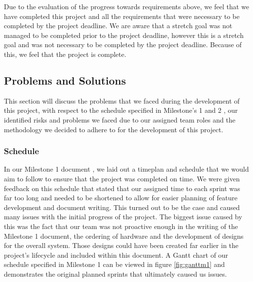             Due to the evaluation of the progress towards requirements above, we feel that we have completed this project and all the requirements that were necessary to be completed by the project deadline. We are aware that a stretch goal was not managed to be completed prior to the project deadline, however this is a stretch goal and was not necessary to be completed by the project deadline. Because of this, we feel that the project is complete.

        \subsection{Problems and Solutions}
        \label{subsec:probs_solutions}

            This section will discuss the problems that we faced during the development of this project, with respect to the schedule specified in Milestone's 1 and 2 \cite{coaker, mile2}, our identified risks and problems we faced due to our assigned team roles and the methodology we decided to adhere to for the development of this project. 

            \subsubsection{Schedule}

                In our Milestone 1 document \cite{coaker}, we laid out a timeplan and schedule that we would aim to follow to ensure that the project was completed on time. We were given feedback on this schedule that stated that our assigned time to each sprint was far too long and needed to be shortened to allow for easier planning of feature development and document writing. This turned out to be the case and caused many issues with the initial progress of the project. The biggest issue caused by this was the fact that our team was not proactive enough in the writing of the Milestone 1 document, the ordering of hardware and the development of designs for the overall system. Those designs could have been created far earlier in the project's lifecycle and included within this document. A Gantt chart of our schedule specified in Milestone 1 can be viewed in figure \ref{fig:ganttm1} and demonstrates the original planned sprints that ultimately caused us issues.

                
                
